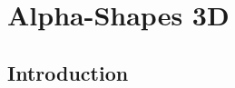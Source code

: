 %
%
%
%
%
%
%
%
%
%



\chapter{Alpha-Shapes 3D} \label{I1_ChapterAlphashapes3D}


\section{Introduction}

